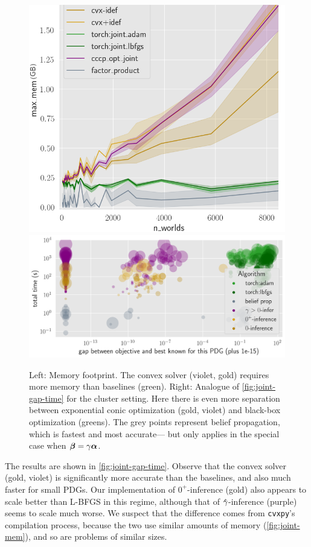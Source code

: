 \begin{figure}
    \centering
    \includegraphics[width=0.34\linewidth]{figs/rand-joint/mem-costs.png}
    \includegraphics[width=0.65\linewidth]{figs/rand-clus/gap-vs-time-agg9.png}
    \caption[Comparison of convex solver and black-box optimization baselines. Memory footprints, and accuracy/time costs for the cluster setting.]
    {%
    Left: Memory footprint.
    The convex solver (violet, gold)
     requires more memory than baselines (green).
    Right: Analogue of \cref{fig:joint-gap-time} for the cluster setting.
     Here there is even more separation between exponential conic optimization
         (gold, violet) and black-box optimization (greens).
     The grey points represent belief propagation, which is fastest and most accurate---%
         but only applies in the special case when $\boldsymbol\beta=\gamma\boldsymbol\alpha$.}
    \label{fig:joint-mem}
    \label{fig:clus-gap-vs-time}
\end{figure}


The results are shown in \cref{fig:joint-gap-time}.
Observe that the convex solver (gold, violet) is significantly more accurate than the baselines,
and also much faster for small PDGs.
Our implementation of $0^+\!$-inference (gold) also appears to scale better than L-BFGS
    in this regime, although
    that of $\zogamma$-inference (purple) seems to scale much worse. 
We suspect that the difference comes from \verb|cvxpy|'s compilation process,
    because the two use similar amounts of memory (\cref{fig:joint-mem}),
    and so are problems of similar sizes.



